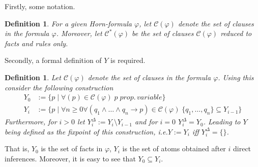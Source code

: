 \documentclass [11pt]{article}
\newtheorem{definition}[theorem]{Definition}
\newcommand{\lto}{\rightarrow}
\begin{document}
Firstly, some notation.
\begin{definition}
For a given Horn-formula $\varphi$, let $\mathcal{C}(\varphi)$ denote the set of clauses in the formula $\varphi$. Moreover, let $\mathcal{C}^*(\varphi)$ be the set of clauses $\mathcal{C}(\varphi)$ reduced to facts and rules only.
\end{definition}

Secondly, a formal definition of $Y$ is required.
\begin{definition}
Let $\mathcal{C}(\varphi)$ denote the set of clauses in the formula $\varphi$. Using this consider the following construction
\begin{equation*}
\begin{split}
Y_0&:=\{p \mid \forall (p)\in \mathcal{C}(\varphi) \; p \mathit{\; prop. \, variable}\} \\
Y_i&:= \{p \mid \forall n \geq 0 \forall (q_1 \land \dots \land q_n \lto p) \in \mathcal{C}(\varphi) \; \{q_1, \dots, q_n\}  \subseteq Y_{i-1}\}
\end{split}
\end{equation*}
Furthermore, for $i>0$ let $Y_i^{\Delta}:= Y_i \setminus Y_{i-1}$ and for $i=0$ $Y_i^{\Delta}=Y_0$. Leading to $Y$ being defined as the fixpoint of this construction, i.e.$Y:= Y_i$ iff $Y_i^{\Delta}= \{\}$.
\end{definition}
That is, $Y_0$ is the set of facts in $\varphi$, $Y_i$ is the set of atoms obtained after $i$ direct inferences. Moreover, it is easy to see that $Y_0 \subseteq Y_i$.


 
\bigskip
\end{document}
